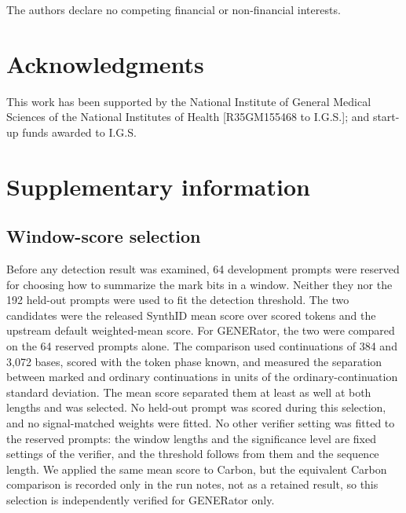 \documentclass[10pt,twocolumn]{article}
\begin{document}
The authors declare no competing financial or non-financial interests.

\section*{Acknowledgments}

This work has been supported by the National Institute of General Medical Sciences of the National
Institutes of Health [R35GM155468 to I.G.S.]; and start-up funds awarded to I.G.S.

\begingroup
\small
\raggedright
\balance


\endgroup

\clearpage
\section*{Supplementary information}
\setcounter{subsection}{0}
\renewcommand{\thesubsection}{S\arabic{subsection}}
\renewcommand{\theHsubsection}{S\arabic{subsection}}
\setcounter{figure}{0}
\renewcommand{\thefigure}{S\arabic{figure}}
\renewcommand{\theHfigure}{S\arabic{figure}}
\setcounter{table}{0}
\renewcommand{\thetable}{S\arabic{table}}
\renewcommand{\theHtable}{S\arabic{table}}

\subsection{Window-score selection}
\label{supp:selection}

Before any detection result was examined, 64 development prompts were reserved for choosing how to
summarize the mark bits in a window. Neither they nor the 192 held-out prompts were used to fit the
detection threshold. The two candidates were the released SynthID mean score over scored tokens and
the upstream default weighted-mean score. For GENERator, the two were compared on the 64 reserved
prompts alone. The comparison used continuations of 384 and 3{,}072 bases, scored with the token
phase known, and measured the separation between marked and ordinary continuations in units of the
ordinary-continuation standard deviation. The mean score separated them at least as well at both
lengths and was selected. No held-out prompt was scored during this selection, and no
signal-matched weights were fitted. No other verifier setting was fitted to the reserved prompts:
the window lengths and the significance level are fixed settings of the verifier, and the
threshold follows from them and the sequence length. We applied the same mean score to Carbon, but the equivalent
Carbon comparison is recorded only in the run notes, not as a retained result, so this selection is
independently verified for GENERator only.
\end{document}
